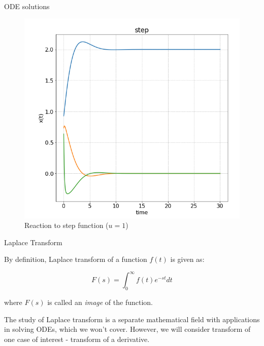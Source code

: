 \documentclass{beamer}
\begin{document}
\begin{frame}{ODE solutions}
\begin{flushleft}
\begin{figure}
  \includegraphics[width=\linewidth]{step.png}
\caption{Reaction to step function ($u = 1$)}
\endminipage
\end{figure}

\end{flushleft}
\end{frame}


\begin{frame}{Laplace Transform}
\begin{flushleft}

By definition, Laplace transform of a function $f(t)$ is given as:

\begin{equation}
    F(s) = \int_0^\infty f(t) e^{-st}dt
\end{equation}

where $F(s)$ is called an \emph{image} of the function.

\bigskip

The study of Laplace transform is a separate mathematical field with applications in solving ODEs, which we won't cover. However, we will consider transform of one case of interest - transform of a derivative. 

\end{flushleft}
\end{frame}
\end{document}
